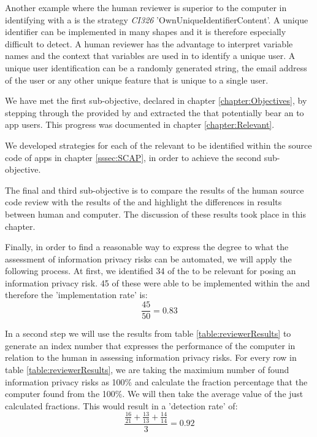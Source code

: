 Another example where the human reviewer is superior to the computer in identifying \ipr with a \sca is the strategy \textit{CI326} 'OwnUniqueIdentifierContent'.
A unique identifier can be implemented in many shapes and it is therefore especially difficult to detect.
A human reviewer has the advantage to interpret variable names and the context that variables are used in to identify a unique user.
A unique user identification can be a randomly generated string, the email address of the user or any other unique feature that is unique to a single user.


We have met the first sub-objective, declared in chapter \ref{chapter:Objectives}, by stepping through the \ipp provided by \textcite{Dehling2016} and extracted the \ipp that potentially bear an \ipr to \mH app users.
This progress was documented in chapter \ref{chapter:Relevant}.

We developed strategies for each of the relevant \ipp to be identified within the source code of \mH apps in chapter \ref{sssec:SCAP}, in order to achieve the second sub-objective.

The final and third sub-objective is to compare the results of the human source code review with the results of the \aiprat and highlight the differences in results between human and computer.
The discussion of these results took place in this chapter.

Finally, in order to find a reasonable way to express the degree to what the assessment of information privacy risks can be automated, we will apply the following process.
At first, we identified 34 of the \ipp to be relevant for posing an information privacy risk. 
45 of these \ipp were able to be implemented within the \aiprat and therefore the 'implementation rate' is:
\begin{equation}
	\frac{45}{50}=0.83
\end{equation}

In a second step we will use the results from table \ref{table:reviewerResults} to generate an index number that expresses the performance of the computer in relation to the human in assessing information privacy risks.
For every row in table \ref{table:reviewerResults}, we are taking the maximium number of found information privacy risks as 100\% and calculate the fraction percentage that the computer found from the 100\%.
We will then take the average value of the just calculated fractions.
This would result in a 'detection rate' of:
\begin{equation}
	\frac{\frac{16}{21} + \frac{13}{13} + \frac{14}{14}}{3} = 0.92
\end{equation}

